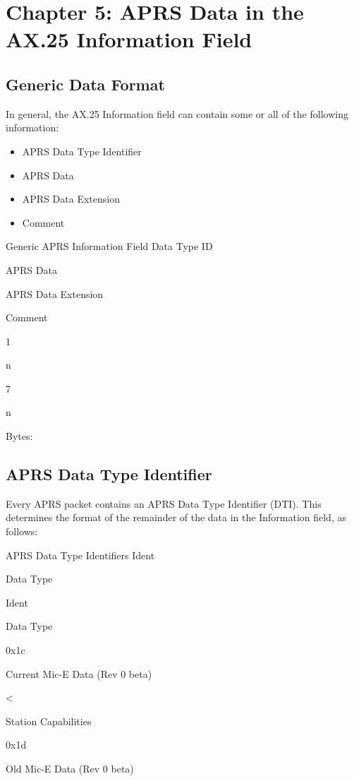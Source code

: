 \chapter {Chapter 5: APRS Data in the AX.25 Information Field}

\section {Generic Data Format}

In general, the AX.25 Information field can contain some or all of the
following information:
\begin{itemize}
\item  APRS Data Type Identifier
\item  APRS Data
\item  APRS Data Extension
\item  Comment
\end{itemize}


Generic APRS Information Field
Data
Type ID

APRS Data

APRS Data
Extension

Comment

1

n

7

n

Bytes:


\section{APRS Data Type Identifier}

Every APRS packet contains an APRS Data Type Identifier (DTI). This
determines the format of the remainder of the data in the Information field, as
follows:


APRS Data Type Identifiers
Ident

Data Type

Ident

Data Type

0x1c

Current Mic-E Data (Rev 0 beta)

<

Station Capabilities

0x1d

Old Mic-E Data (Rev 0 beta)

